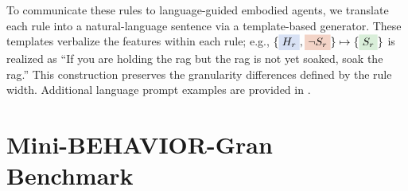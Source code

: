 \documentclass[11pt]{article}
\newcommand{\hlA}[1]{\colorbox{RoyalBlue!15}{#1}}
\newcommand{\hlB}[1]{\colorbox{BrickRed!15}{#1}}
\newcommand{\hlC}[1]{\colorbox{ForestGreen!15}{#1}}
\begin{document}

To communicate these rules to language-guided embodied agents, we translate each rule into a natural-language sentence via a template-based generator. These templates verbalize the features within each rule; e.g., $\{\hlA{$H_r$}, \hlB{$\neg S_r$}\} \mapsto \{\hlC{$S_r$}\}$ is realized as ``If you are \hlA{holding the rag} but \hlB{the rag is not yet soaked}, \hlC{soak the rag}.'' This construction preserves the granularity differences defined by the rule width. Additional language prompt examples are provided in .


\section{Mini-BEHAVIOR-Gran Benchmark}
\label{sec:benchmark}
\end{document}
